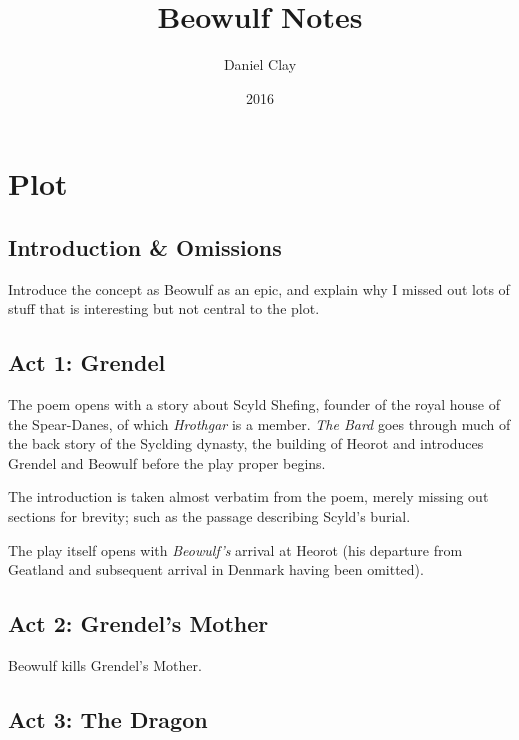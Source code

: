 \documentclass[a4paper]{article}
\begin{document}
\title{Beowulf Notes}
\date{2016}
\author{
Daniel Clay \\ 
}
\maketitle

\section{Plot}

\subsection{Introduction \& Omissions}%

Introduce the concept as Beowulf as an epic, and explain why I missed out lots of
stuff that is interesting but not central to the plot. 

\subsection{Act 1: Grendel}%

The poem opens with a story about Scyld Shefing, founder of the royal house
of the Spear-Danes, of which \textit{Hrothgar} is a member. \textit{The Bard} 
goes through much of the back story of the Syclding dynasty, the building of Heorot
and introduces Grendel and Beowulf before the play proper begins.

The introduction is taken almost verbatim from the poem, merely missing out sections
for brevity; such as the passage describing Scyld's burial.

The play itself opens with \textit{Beowulf's} arrival at Heorot (his departure
from Geatland and subsequent arrival in Denmark having been omitted). 

\subsection{Act 2: Grendel's Mother}%

Beowulf kills Grendel's Mother.

\subsection{Act 3: The Dragon}%
\end{document}
